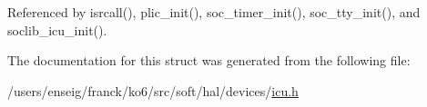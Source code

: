 Referenced by isrcall(), plic\-\_\-init(), soc\-\_\-timer\-\_\-init(), soc\-\_\-tty\-\_\-init(), and soclib\-\_\-icu\-\_\-init().



The documentation for this struct was generated from the following file\-:\begin{DoxyCompactItemize}
\item 
/users/enseig/franck/ko6/src/soft/hal/devices/\hyperlink{icu_8h}{icu.\-h}\end{DoxyCompactItemize}
